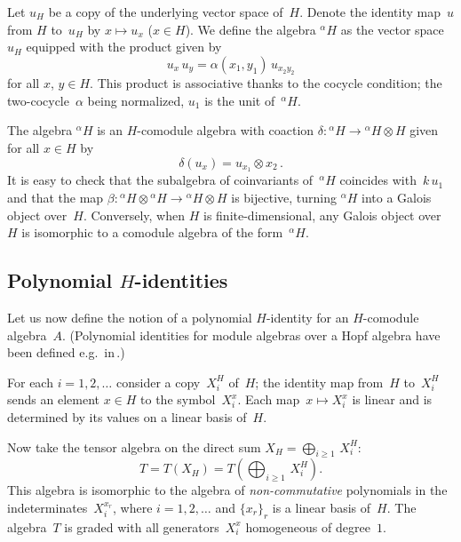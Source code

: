 \documentclass[11pt, a4paper]{amsart}
\theoremstyle{definition}
\numberwithin{equation}{section}
\begin{document}
Let $u_H$ be a copy of the underlying vector space of~$H$.
Denote the identity map~$u$ from $H$ to~$u_H$ by $x \mapsto u_x$ ($x\in H$).
We define the {algebra} ${}^{\alpha} H$ as the vector space~$u_H$ equipped 
with the product given by
\begin{equation*}\label{twisted-multiplication}
u_x \,   u_y = \alpha(x_1, y_1) \, u_{x_2 y_2}
\end{equation*}
for all $x$, $y \in H$.
This product is associative thanks to the cocycle condition;
the two-cocycle~$\alpha$ being normalized,
$u_1$ is the unit of~${}^{\alpha} H$.

The algebra ${}^{\alpha} H$ is an $H$-comodule algebra
with coaction 
$\delta \colon {}^{\alpha} H \to {}^{\alpha} H \otimes H$
given for all $x\in H$ by
\begin{equation*}\label{twisted-coaction}
\delta (u_x) = u_{x_1} \otimes x_2 \, .
\end{equation*}
It is easy to check that the subalgebra of coinvariants of~${}^{\alpha} H$ coincides with~$k \, u_1$ 
and that the map $\beta: {}^{\alpha} H \otimes {}^{\alpha} H \to {}^{\alpha} H \otimes H$ is bijective,
turning ${}^{\alpha} H$ into a Galois object over~$H$.
Conversely, when $H$ is finite-dimensional, 
any Galois object over~$H$ is isomorphic to a comodule algebra of the form~${}^{\alpha} H$.

\subsection{Polynomial $H$-identities}\label{ssec-PI}

Let us now define the notion of a polynomial $H$-identity for an $H$-comodule algebra~$A$.
(Polynomial identities for module algebras over a Hopf algebra have been defined e.g.\ in\,\cite{BL, Be}.)

For each $i = 1, 2,\ldots $ consider a copy~$X_i^H$ of~$H$; the identity map from~$H$ to~$X_i^H$
sends an element $x\in H$ to the symbol~$X_i^x$. 
Each map~$x \mapsto X_i^x$ is linear and is determined by its values on a linear basis of~$H$. 

Now take the tensor algebra on the direct sum $X_H = \bigoplus_{i\geq 1} \, X_i^H$:
\[
T = T(X_H) = T \left(\bigoplus_{i\geq 1} \, X_i^H \right) .
\]
This algebra is isomorphic to the algebra of \emph{non-commutative} polynomials in the indeterminates~$X_i^{x_r}$,
where $i= 1, 2, \ldots$ and $\{x_r\}_r$ is a linear basis of~$H$.
The algebra~$T$ is graded with all generators~$X_i^x$ homogeneous of degree~$1$.
\end{document}
